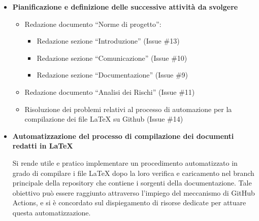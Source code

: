 \documentclass{article}
\begin{document}
\begin{itemize}
  \item \textbf{\fontsize{12}{6}\selectfont Pianificazione e definizione delle successive attività da svolgere}
  \begin{itemize}
    \item Redazione documento “Norme di progetto”:
    \begin{itemize}
      \item Redazione sezione “Introduzione” (Issue \#13)
      \item Redazione sezione “Comunicazione” (Issue \#10)
      \item Redazione sezione “Documentazione” (Issue \#9)
    \end{itemize}
    \item Redazione documento “Analisi dei Rischi” (Issue \#11)
    \item Risoluzione dei problemi relativi al processo di automazione per la compilazione dei file LaTeX su Github  (Issue \#14)
  \end{itemize}
  \vspace{0.5cm}
  
  \item \textbf{\fontsize{12}{6}\selectfont Automatizzazione del processo di compilazione dei documenti redatti in LaTeX}
  
  Si rende utile e pratico implementare un procedimento automatizzato in grado di compilare i file LaTeX dopo la loro verifica e caricamento nel branch principale della repository che contiene i sorgenti della documentazione. Tale obiettivo può essere raggiunto attraverso l'impiego del meccanismo di GitHub Actions, e si è concordato sul dispiegamento di risorse dedicate per attuare questa automatizzazione.\vspace{0.5cm}
  \end{itemize}
\end{document}
